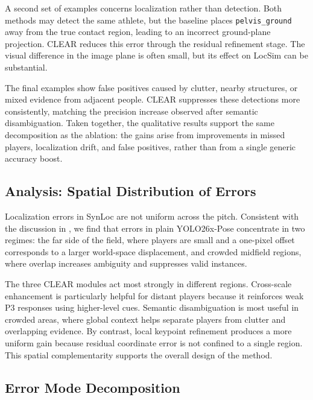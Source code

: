A second set of examples concerns localization rather than detection. Both methods may detect the same athlete, but the baseline places \texttt{pelvis\_ground} away from the true contact region, leading to an incorrect ground-plane projection. CLEAR reduces this error through the residual refinement stage. The visual difference in the image plane is often small, but its effect on LocSim can be substantial.

The final examples show false positives caused by clutter, nearby structures, or mixed evidence from adjacent people. CLEAR suppresses these detections more consistently, matching the precision increase observed after semantic disambiguation. Taken together, the qualitative results support the same decomposition as the ablation: the gains arise from improvements in missed players, localization drift, and false positives, rather than from a single generic accuracy boost.

\subsection{Analysis: Spatial Distribution of Errors}
\label{sec:spatial-analysis}

Localization errors in SynLoc are not uniform across the pitch. Consistent with the discussion in , we find that errors in plain YOLO26x-Pose concentrate in two regimes: the far side of the field, where players are small and a one-pixel offset corresponds to a larger world-space displacement, and crowded midfield regions, where overlap increases ambiguity and suppresses valid instances.

The three CLEAR modules act most strongly in different regions. Cross-scale enhancement is particularly helpful for distant players because it reinforces weak P3 responses using higher-level cues. Semantic disambiguation is most useful in crowded areas, where global context helps separate players from clutter and overlapping evidence. By contrast, local keypoint refinement produces a more uniform gain because residual coordinate error is not confined to a single region. This spatial complementarity supports the overall design of the method.

\subsection{Error Mode Decomposition}
\label{sec:error-decomposition}

